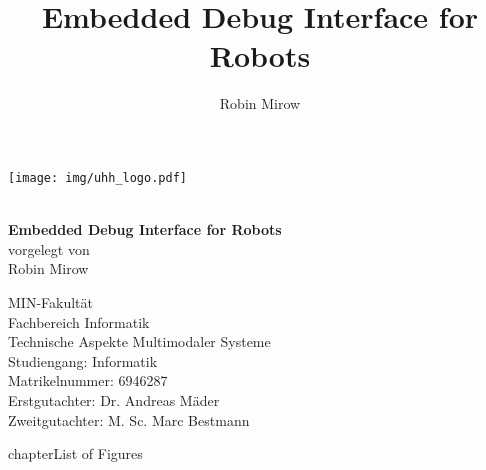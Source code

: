 \documentclass[12pt,DIV=13,BCOR=1.5cm,a4paper,twoside,bibliography=totoc,headings=small,headinclude,headsepline,numbers=noenddot]{scrbook}
\title{Embedded Debug Interface for Robots}
\author{Robin Mirow}
\begin{document}
\sloppy
{}
\pagestyle{empty}

\begin{titlepage}

	\sffamily

    \texttt{[image: img/uhh\_logo.pdf]}
    \vspace*{2cm}\Large
    \begin{center}
        {\color{uhh-red}\textbf{}}
        \vspace*{2.0cm} \\
        {\LARGE \textbf{Embedded Debug Interface for Robots}}
        \vspace*{2.0cm} \\
        vorgelegt von \vspace*{0.4cm} \\
        Robin Mirow 
    \end{center}
    \vspace*{3.9cm}
    \noindent
    MIN-Fakultät \vspace*{0.4cm} \\
    Fachbereich Informatik \vspace*{0.4cm} \\
    Technische Aspekte Multimodaler Systeme \vspace*{0.4cm} \\
    Studiengang: Informatik \vspace*{0.4cm} \\
    Matrikelnummer: 6946287 \vspace*{0.8cm} \\
    Erstgutachter: 	Dr. Andreas Mäder \vspace*{0.4cm} \\
    Zweitgutachter: M. Sc. Marc Bestmann
\end{titlepage}
\restoregeometry

\linespread{1}\selectfont
\cleardoublepage


\cleardoublepage

\pagestyle{headings}
\setcounter{tocdepth}{1}
\tableofcontents
\listoffigures
{} {chapter}{List of Figures}
\cleardoublepage
{}









\end{document}
